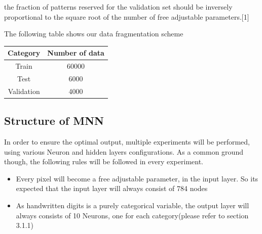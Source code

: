 \documentclass{proc}
\begin{document}
	the fraction of patterns reserved for the
	validation set should be inversely proportional to the square root of the number of free adjustable
	parameters.[1]
	
	The following table shows our data fragmentation scheme
	\begin{center}
		\begin{tabular}{ |c|c| } 
			\hline
			Category & Number of data\\
			\hline
			Train & 60000 \\ 
			Test & 6000 \\ 
			Validation & 4000 \\ 
			\hline
		\end{tabular}
	\end{center}

	\subsection{Structure of MNN}
	In order to ensure the optimal output, multiple experiments will be performed, using various Neuron and hidden layers configurations. As a common ground though, the following rules will be followed in every experiment.
	
	\begin{itemize}
		\item Every pixel will become a free adjustable parameter, in the input layer. So its expected that the input layer will always consist of 784 nodes
		\item As handwritten digits is a purely categorical variable, the output layer will always consists of 10 Neurons, one for each category(please refer to section 3.1.1)
	\end{itemize}
	
\end{document}
